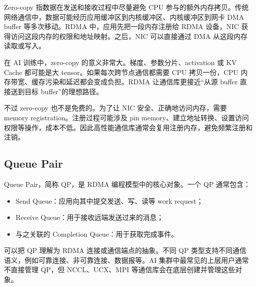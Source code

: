 Zero-copy 指数据在发送和接收过程中尽量避免 CPU 参与的额外内存拷贝。传统网络通信中，数据可能经历应用缓冲区到内核缓冲区、内核缓冲区到网卡 DMA buffer 等多次移动。RDMA 中，应用先把一段内存注册给 RDMA 设备，NIC 获得访问这段内存的权限和地址映射。之后，NIC 可以直接通过 DMA 从这段内存读取或写入。

在 AI 训练中，zero-copy 的意义非常大。梯度、参数分片、activation 或 KV Cache 都可能是大 tensor。如果每次跨节点通信都需要 CPU 拷贝一份，CPU 内存带宽、缓存污染和延迟都会变成负担。RDMA 让通信库更接近“从源 buffer 直接送到目标 buffer”的理想路径。

不过 zero-copy 也不是免费的。为了让 NIC 安全、正确地访问内存，需要 memory registration。注册过程可能涉及 pin memory、建立地址转换、设置访问权限等操作，成本不低。因此高性能通信库通常会复用注册内存，避免频繁注册和注销。

\subsection{Queue Pair}
\label{subsec:queue-pair}

Queue Pair，简称 QP，是 RDMA 编程模型中的核心对象。一个 QP 通常包含：

\begin{itemize}
  \item Send Queue：应用向其中提交发送、写、读等 work request；
  \item Receive Queue：用于接收远端发送过来的消息；
  \item 与之关联的 Completion Queue：用于获取完成事件。
\end{itemize}

可以把 QP 理解为 RDMA 连接或通信端点的抽象。不同 QP 类型支持不同通信语义，例如可靠连接、非可靠连接、数据报等。AI 集群中最常见的上层用户通常不直接管理 QP，但 NCCL、UCX、MPI 等通信库会在底层创建并管理这些对象。


